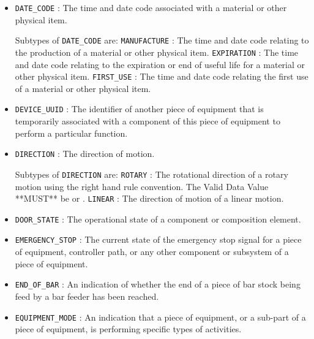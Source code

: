 \begin{itemize}
\item \texttt{DATE_CODE} : The time and date code associated with a material or other physical item. 

Subtypes of \texttt{DATE_CODE} are: 
\newline\tab \texttt{MANUFACTURE} : The time and date code relating to the production of a material or other physical item. 
\newline\tab \texttt{EXPIRATION} : The time and date code relating to the expiration or end of useful life for a material or other physical item. 
\newline\tab \texttt{FIRST_USE} : The time and date code relating the first use of a material or other physical item. 
\item \texttt{DEVICE_UUID} : The identifier of another piece of equipment that is temporarily associated with a component of this piece of equipment to perform a particular function. 

\item \texttt{DIRECTION} : The direction of motion. 

Subtypes of \texttt{DIRECTION} are: 
\newline\tab \texttt{ROTARY} : The rotational direction of a rotary motion using the right hand rule convention.
 The \gls{Valid Data Value} **MUST** be  or . 
\newline\tab \texttt{LINEAR} : The direction of motion of a linear motion. 
\item \texttt{DOOR_STATE} : The operational state of a  component or composition element. 

\item \texttt{EMERGENCY_STOP} : The current state of the emergency stop signal for a piece of equipment, controller path, or any other component or subsystem of a piece of equipment. 

\item \texttt{END_OF_BAR} : An indication of whether the end of a piece of bar stock being feed by a bar feeder has been reached. 

\item \texttt{EQUIPMENT_MODE} : An indication that a piece of equipment, or a sub-part of a piece of equipment, is performing specific types of activities. 


\end{itemize}
